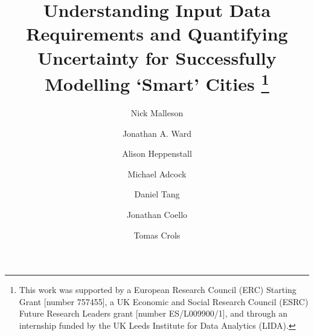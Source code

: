 \documentclass[runningheads]{llncs}
\begin{document}
%
\title{Understanding Input Data Requirements and Quantifying Uncertainty for Successfully Modelling `Smart' Cities 
\thanks{This work was supported by a European Research Council (ERC) Starting Grant [number 757455], a UK Economic and Social Research Council (ESRC) Future Research Leaders grant [number ES/L009900/1], and through an internship funded by the UK Leeds Institute for Data Analytics (LIDA).}}

%
%

\author{Nick Malleson \and
Jonathan A. Ward \and
Alison Heppenstall \and
Michael Adcock \and
Daniel Tang  \and
Jonathan Coello \and
Tomas Crols
}
%
\end{document}
